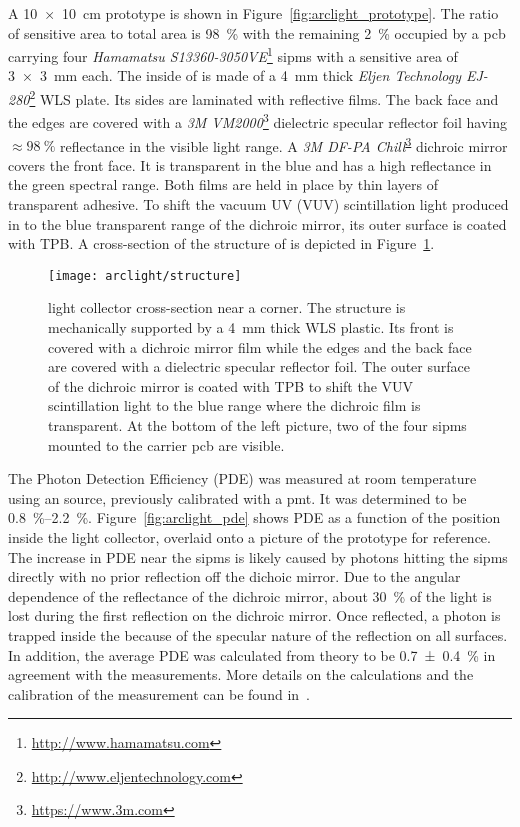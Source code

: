 A \SI{10 x 10}{\centi\metre} \AL{} prototype is shown in Figure~\ref{fig:arclight_prototype}.
The ratio of sensitive area to total area is \SI{98}{\percent} with the remaining \SI{2}{\percent} occupied by a \gls{pcb} carrying four \emph{Hamamatsu S13360-3050VE}\footnote{\url{http://www.hamamatsu.com}} \glspl{sipm} with a sensitive area of \SI{3 x 3}{\milli\metre} each.
The inside of \AL{} is made of a \SI{4}{\milli\metre} thick \emph{Eljen Technology EJ-280}\footnote{\url{http://www.eljentechnology.com}} WLS plate.
Its sides are laminated with reflective films.
The back face and the edges are covered with a \emph{3M VM2000}\footnote{\url{https://www.3m.com}\label{foot:3M}} dielectric specular reflector foil having $\approx \SI{98}{\percent}$ reflectance in the visible light range.
A \emph{3M DF-PA Chill}\textsuperscript{\ref{foot:3M}} dichroic mirror covers the front face.
It is transparent in the blue and has a high reflectance in the green spectral range.
Both films are held in place by thin layers of transparent adhesive.
To shift the vacuum UV (VUV) scintillation light produced in \lar{} to the blue transparent range of the dichroic mirror, its outer surface is coated with TPB.
A cross-section of the structure of \AL{} is depicted in Figure~\ref{fig:arclight_structure}.

\begin{figure}[htb]
	\centering
	\texttt{[image: arclight/structure]}
	\caption{\AL{} light collector cross-section near a corner.
		The structure is mechanically supported by a \SI{4}{\milli\metre} thick WLS plastic.
		Its front is covered with a dichroic mirror film while the edges and the back face are covered with a dielectric specular reflector foil.
		The outer surface of the dichroic mirror is coated with TPB to shift the \lar{} VUV scintillation light to the blue range where the dichroic film is transparent.
		At the bottom of the left picture, two of the four \glspl{sipm} mounted to the carrier \gls{pcb} are visible.}
	\label{fig:arclight_structure}
\end{figure}

The Photon Detection Efficiency (PDE) was measured at room temperature using an  source, previously calibrated with a \gls{pmt}.
It was determined to be \SIrange{0.8}{2.2}{\percent}.
Figure~\ref{fig:arclight_pde} shows PDE as a function of the position inside the light collector, overlaid onto a picture of the prototype for reference.
The increase in PDE near the \glspl{sipm} is likely caused by photons hitting the \glspl{sipm} directly with no prior reflection off the dichoic mirror.
Due to the angular dependence of the reflectance of the dichroic mirror, about \SI{30}{\percent} of the light is lost during the first reflection on the dichroic mirror.
Once reflected, a photon is trapped inside the \AL{} because of the specular nature of the reflection on all surfaces.
In addition, the average PDE was calculated from theory to be \SI{0.7 +- 0.4}{\percent} in agreement with the measurements.
More details on the calculations and the calibration of the measurement can be found in~\cite{arclight}.

